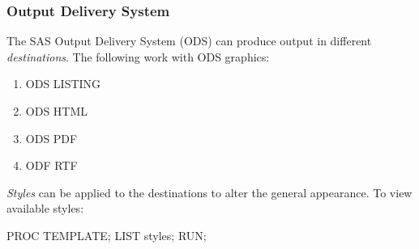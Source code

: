 \begin{frame}[fragile]
\frametitle{Output Delivery System}
The SAS Output Delivery System (ODS) can produce output in different \emph{destinations}.  The following work with ODS graphics:
\begin{enumerate}
    \item ODS LISTING
    \item ODS HTML
    \item ODS PDF
    \item ODF RTF
\end{enumerate}
\vskip10pt
\emph{Styles} can be applied to the destinations to alter the general appearance. To view available styles:
\emp
{} \hspace{0.05in} \emp
{}
\footnotesize
\begin{code}{.0}
PROC TEMPLATE;
   LIST styles;
RUN;
\end{code}
\emp

\end{frame}
%
%
%

